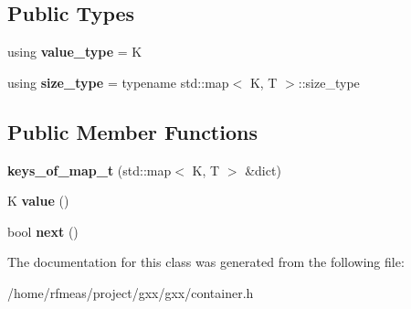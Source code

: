 \subsection*{Public Types}
\begin{DoxyCompactItemize}
\item 
using {\bfseries value\+\_\+type} = K\hypertarget{classgxx_1_1gen_1_1keys__of__map__t_ab91623aaf55697fa8c6631ca80af98a3}{}\label{classgxx_1_1gen_1_1keys__of__map__t_ab91623aaf55697fa8c6631ca80af98a3}

\item 
using {\bfseries size\+\_\+type} = typename std\+::map$<$ K, T $>$\+::size\+\_\+type\hypertarget{classgxx_1_1gen_1_1keys__of__map__t_af7d1b5e9d57b0073a69d89049bdcadb1}{}\label{classgxx_1_1gen_1_1keys__of__map__t_af7d1b5e9d57b0073a69d89049bdcadb1}

\end{DoxyCompactItemize}
\subsection*{Public Member Functions}
\begin{DoxyCompactItemize}
\item 
{\bfseries keys\+\_\+of\+\_\+map\+\_\+t} (std\+::map$<$ K, T $>$ \&dict)\hypertarget{classgxx_1_1gen_1_1keys__of__map__t_a5ec6c7664cf1eee1b2735677e27c0957}{}\label{classgxx_1_1gen_1_1keys__of__map__t_a5ec6c7664cf1eee1b2735677e27c0957}

\item 
K {\bfseries value} ()\hypertarget{classgxx_1_1gen_1_1keys__of__map__t_a3ae906379414c4babb9cbdca197fac54}{}\label{classgxx_1_1gen_1_1keys__of__map__t_a3ae906379414c4babb9cbdca197fac54}

\item 
bool {\bfseries next} ()\hypertarget{classgxx_1_1gen_1_1keys__of__map__t_ad7aa3cc4aaded9267a821ff341fa2f5c}{}\label{classgxx_1_1gen_1_1keys__of__map__t_ad7aa3cc4aaded9267a821ff341fa2f5c}

\end{DoxyCompactItemize}


The documentation for this class was generated from the following file\+:\begin{DoxyCompactItemize}
\item 
/home/rfmeas/project/gxx/gxx/container.\+h\end{DoxyCompactItemize}
